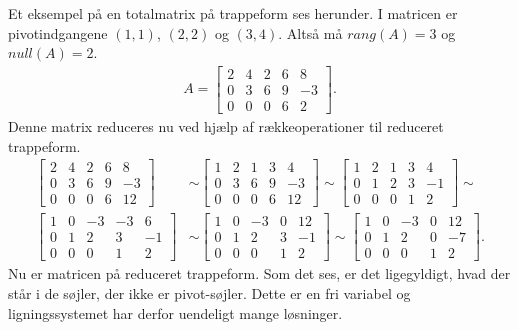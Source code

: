 \begin{eks}
Et eksempel på en totalmatrix på trappeform ses herunder. I matricen er pivotindgangene $(1,1)$, $(2,2)$ og $(3,4)$. Altså må $rang(A)=3$ og $null(A)=2$. 
\begin{align*}
A= \begin{bmatrix}
2 & 4 & 2 & 6 & 8 \\
0 & 3 & 6 & 9 & -3 \\
0 & 0 & 0 & 6 & 2
\end{bmatrix}. 
\end{align*}
Denne matrix reduceres nu ved hjælp af rækkeoperationer til reduceret trappeform.\\
\begin{align*}
\begin{bmatrix}
2 & 4 & 2 & 6 & 8 \\
0 & 3 & 6 & 9 & -3 \\
0 & 0 & 0 & 6 & 12
\end{bmatrix}
&\sim
\begin{bmatrix}
1 & 2 & 1 & 3 & 4 \\
0 & 3 & 6 & 9 & -3 \\
0 & 0 & 0 & 6 & 12
\end{bmatrix}
\sim
\begin{bmatrix}
1 & 2 & 1 & 3 & 4 \\
0 & 1 & 2 & 3 & -1 \\
0 & 0 & 0 & 1 & 2
\end{bmatrix}
\sim \\
\begin{bmatrix}
1 & 0 & -3 & -3 & 6 \\
0 & 1 & 2 & 3 & -1 \\
0 & 0 & 0 & 1 & 2
\end{bmatrix}
&\sim
\begin{bmatrix}
1 & 0 & -3 & 0 & 12 \\
0 & 1 & 2 & 3 & -1 \\
0 & 0 & 0 & 1 & 2
\end{bmatrix}
\sim
\begin{bmatrix}
1 & 0 & -3 & 0 & 12 \\
0 & 1 & 2 & 0 & -7 \\
0 & 0 & 0 & 1 & 2
\end{bmatrix}.
\end{align*}
Nu er matricen på reduceret trappeform. Som det ses, er det ligegyldigt, hvad der står i de søjler, der ikke er pivot-søjler. Dette er en fri variabel og ligningssystemet har derfor uendeligt mange løsninger.\\ 

\end{eks}
